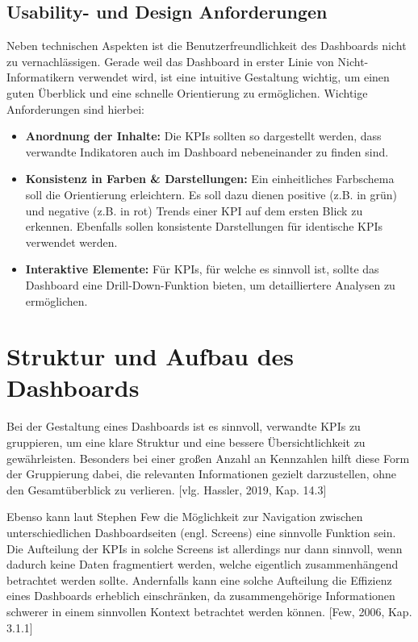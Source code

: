 \subsection{Usability- und Design Anforderungen}
Neben technischen Aspekten ist die Benutzerfreundlichkeit des Dashboards nicht zu vernachlässigen. Gerade weil das Dashboard in erster Linie von Nicht-Informatikern verwendet wird, ist eine intuitive Gestaltung wichtig, um einen guten Überblick und eine schnelle Orientierung zu ermöglichen. Wichtige Anforderungen sind hierbei:
\begin{itemize}
    \item \textbf{Anordnung der Inhalte:} Die KPIs sollten so dargestellt werden, dass verwandte Indikatoren auch im Dashboard nebeneinander zu finden sind.
    \item \textbf{Konsistenz in Farben \& Darstellungen:} Ein einheitliches Farbschema soll die Orientierung erleichtern. Es soll dazu dienen positive (z.B. in grün) und negative (z.B. in rot) Trends einer KPI auf dem ersten Blick zu erkennen. Ebenfalls sollen konsistente Darstellungen für identische KPIs verwendet werden.
    \item \textbf{Interaktive Elemente:} Für KPIs, für welche es sinnvoll ist, sollte das Dashboard eine Drill-Down-Funktion bieten, um detailliertere Analysen zu ermöglichen.
\end{itemize}

\section{Struktur und Aufbau des Dashboards}
Bei der Gestaltung eines Dashboards ist es sinnvoll, verwandte KPIs zu gruppieren, um eine klare Struktur und eine bessere Übersichtlichkeit zu gewährleisten. Besonders bei einer großen Anzahl an Kennzahlen hilft diese Form der Gruppierung dabei, die relevanten Informationen gezielt darzustellen, ohne den Gesamtüberblick zu verlieren. [vlg. Hassler, 2019, Kap. 14.3]

Ebenso kann laut Stephen Few die Möglichkeit zur Navigation zwischen unterschiedlichen Dashboardseiten (engl. Screens) eine sinnvolle Funktion sein. Die Aufteilung der KPIs in solche Screens ist allerdings nur dann sinnvoll, wenn dadurch keine Daten fragmentiert werden, welche eigentlich zusammenhängend betrachtet werden sollte. Andernfalls kann eine solche Aufteilung die Effizienz eines Dashboards erheblich einschränken, da zusammengehörige Informationen schwerer in einem sinnvollen Kontext betrachtet werden können. [Few, 2006, Kap. 3.1.1]

